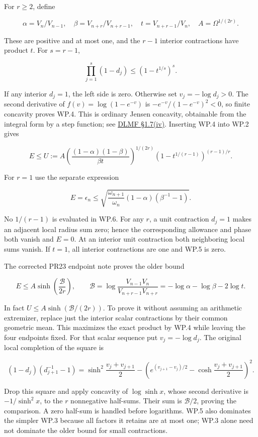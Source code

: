 For \(r\ge2\), define

\[
\alpha=V_n/V_{n-1},\quad \beta=V_{n+r}/V_{n+r-1},\quad
t=V_{n+r-1}/V_n,\quad A=\Omega^{1/(2r)}.
\]

These are positive and at most one, and the \(r-1\) interior contractions have product \(t\). For \(s=r-1\),

\[
\prod_{j=1}^s(1-d_j)\le(1-t^{1/s})^s. \tag{WP.4}
\]

If any interior \(d_j=1\), the left side is zero. Otherwise set \(v_j=-\log d_j>0\). The second derivative of \(f(v)=\log(1-e^{-v})\) is \(-e^{-v}/(1-e^{-v})^2<0\), so finite concavity proves WP.4. This is ordinary Jensen concavity, obtainable from the integral form by a step function; see \href{https://dlmf.nist.gov/1.7.iv}{DLMF §1.7(iv)}. Inserting WP.4 into WP.2 gives

\[
\boxed{E\le U:=A
\left(\frac{(1-\alpha)(1-\beta)}{\beta t}\right)^{1/(2r)}
\left(1-t^{1/(r-1)}\right)^{(r-1)/r}.} \tag{WP.5}
\]

For \(r=1\) use the separate expression

\[
E=\epsilon_n\le\sqrt{\frac{\omega_{n+1}}{\omega_n}
(1-\alpha)(\beta^{-1}-1)}. \tag{WP.6}
\]

No \(1/(r-1)\) is evaluated in WP.6. For any \(r\), a unit contraction \(d_j=1\) makes an adjacent local radius sum zero; hence the corresponding allowance and phase both vanish and \(E=0\). At an interior unit contraction both neighboring local sums vanish. If \(t=1\), all interior contractions are one and WP.5 is zero.

The corrected PR23 endpoint note proves the older bound

\[
E\le A\sinh\!\left(\frac{\mathcal B}{2r}\right),\qquad
\mathcal B=\log\frac{V_{n-1}V_n}{V_{n+r-1}V_{n+r}}
=-\log\alpha-\log\beta-2\log t.
\]

In fact \(U\le A\sinh(\mathcal B/(2r))\). To prove it without assuming an arithmetic extremizer, replace just the interior scalar contractions by their common geometric mean. This maximizes the exact product by WP.4 while leaving the four endpoints fixed. For that scalar sequence put \(v_j=-\log d_j\). The original local completion of the square is

\[
(1-d_j)(d_{j+1}^{-1}-1)
=\sinh^2\frac{v_j+v_{j+1}}2
-\left(e^{(v_{j+1}-v_j)/2}-\cosh\frac{v_j+v_{j+1}}2\right)^2.
\]

Drop this square and apply concavity of \(\log\sinh x\), whose second derivative is \(-1/\sinh^2x\), to the \(r\) nonnegative half-sums. Their sum is \(\mathcal B/2\), proving the comparison. A zero half-sum is handled before logarithms. WP.5 also dominates the simpler WP.3 because all factors it retains are at most one; WP.3 alone need not dominate the older bound for small contractions.

